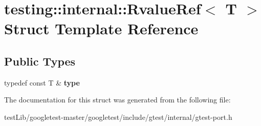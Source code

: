 \hypertarget{structtesting_1_1internal_1_1RvalueRef}{}\section{testing\+:\+:internal\+:\+:Rvalue\+Ref$<$ T $>$ Struct Template Reference}
\label{structtesting_1_1internal_1_1RvalueRef}
\subsection*{Public Types}
\begin{DoxyCompactItemize}
\item 
\mbox{\label{structtesting_1_1internal_1_1RvalueRef_ad09f1fbc87569c7e2837274193097e44}} 
typedef const T \& {\bfseries type}
\end{DoxyCompactItemize}


The documentation for this struct was generated from the following file\+:\begin{DoxyCompactItemize}
\item 
test\+Lib/googletest-\/master/googletest/include/gtest/internal/gtest-\/port.\+h\end{DoxyCompactItemize}
